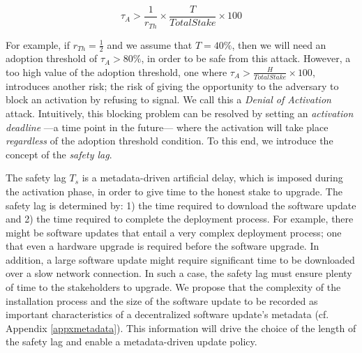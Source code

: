 \begin{equation} \label{tauA}
\tau_A > \frac{1}{r_{Th}} \times \frac{T}{TotalStake}\times 100
\end{equation}

For example, if $r_{Th} = \frac{1}{2}$ and we assume that $T = 40\%$, then we will need an adoption threshold of $\tau_A > 80\% $, in order to be safe from this attack. However, a too high value of the adoption threshold, one where $\tau_A > \frac{H}{TotalStake} \times 100$, introduces another risk; the risk of  giving the opportunity to the adversary to block an activation by refusing to signal. We call this a \emph{Denial of Activation} attack. Intuitively, this blocking problem can be resolved by setting an \emph{activation deadline} ---a time point in the future--- where the activation will take place \emph{regardless} of the adoption threshold condition. To this end, we introduce the concept of the \emph{safety lag}.

The safety lag $T_s$ is a metadata-driven artificial delay, which is imposed during the activation phase, in order to give time to the honest stake to upgrade. The safety lag is determined by: 1) the time required to download the software update and 2) the time required to complete the deployment process.
 For example, there might be software updates that entail a very complex deployment process; one that even  a hardware upgrade is required before the software upgrade. In addition, a large software update might require significant time to be downloaded over a slow network connection. In such a case, the safety lag must ensure plenty of time to the stakeholders to upgrade.  
We propose that the complexity of the installation process and the size of the software update to be recorded as important characteristics of a decentralized software update's metadata (cf. Appendix \ref{appxmetadata}). This information will drive the choice of the length of the safety lag and enable a metadata-driven update policy.

